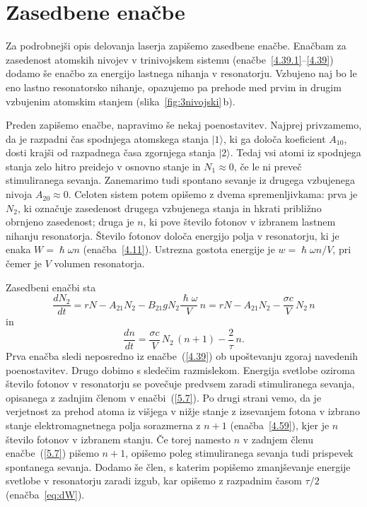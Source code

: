 \section{Zasedbene enačbe}
Za podrobnejši opis delovanja laserja zapišemo zasedbene enačbe. 
Enačbam za zasedenost atomskih nivojev 
v trinivojskem sistemu (enačbe~\ref{4.39.1}--\ref{4.39}) dodamo še enačbo za 
energijo lastnega nihanja v resonatorju. Vzbujeno naj bo 
le eno lastno resonatorsko nihanje, opazujemo pa prehode med prvim 
in drugim vzbujenim atomskim stanjem (slika~\ref{fig:3nivojski}\,b). 

Preden zapišemo enačbe, napravimo še nekaj poenostavitev. Najprej privzamemo, 
da je razpadni čas spodnjega atomskega stanja $|1\rangle$, 
ki ga določa koeficient $A_{10}$, dosti krajši od razpadnega
časa zgornjega stanja $|2\rangle$. Tedaj vsi atomi iz spodnjega stanja zelo 
hitro preidejo v osnovno stanje in $N_1 \approx 0$, če le ni preveč
stimuliranega sevanja. Zanemarimo tudi spontano sevanje iz drugega vzbujenega
nivoja $A_{20} \approx 0$. Celoten sistem potem opišemo z dvema 
spremenljivkama: prva je $N_2$, ki označuje zasedenost drugega vzbujenega
stanja in hkrati približno obrnjeno zasedenost; druga je $n$, ki pove število
fotonov v izbranem lastnem nihanju resonatorja. Število fotonov določa energijo 
polja v resonatorju, ki je enaka $W = \hslash\omega n$ (enačba~\ref{4.11}). Ustrezna
gostota energije je $w = \hslash\omega n/V$, pri čemer je $V$ volumen resonatorja.

Zasedbeni enačbi sta
\begin{equation}
\frac{dN_2}{dt}=rN-A_{21}N_2-B_{21}gN_2\frac{\hslash \omega}{V}\,n
=rN-A_{21}N_2-\frac{\sigma c}{V}\, N_2\,n
\label{5.7}
\end{equation}
in 
\begin{equation}
\frac{dn}{dt}=\frac{\sigma c}{V}\, N_2\,(n+1)-\frac{2}{\tau}\,n.
\label{5.8}
\end{equation}
Prva enačba sledi neposredno iz enačbe~(\ref{4.39}) ob upoštevanju zgoraj navedenih
poenostavitev. Drugo  dobimo s sledečim razmislekom. Energija svetlobe 
oziroma število fotonov v resonatorju se povečuje predvsem 
zaradi stimuliranega sevanja, opisanega z zadnjim členom v enačbi~(\ref{5.7}).
Po drugi strani vemo, da je verjetnost za prehod atoma iz višjega v nižje stanje z 
izsevanjem fotona v izbrano stanje elektromagnetnega polja sorazmerna z 
$n+1$ (enačba~\ref{4.59}), kjer je $n$ število fotonov v izbranem stanju. 
Če torej namesto $n$ v zadnjem členu enačbe~(\ref{5.7}) pišemo $n+1$, 
opišemo poleg stimuliranega sevanja tudi prispevek spontanega sevanja. Dodamo še 
člen, s katerim popišemo zmanjševanje energije svetlobe v resonatorju zaradi 
izgub, kar opišemo z razpadnim časom $\tau/2$ (enačba~\ref{eq:dW}). 

